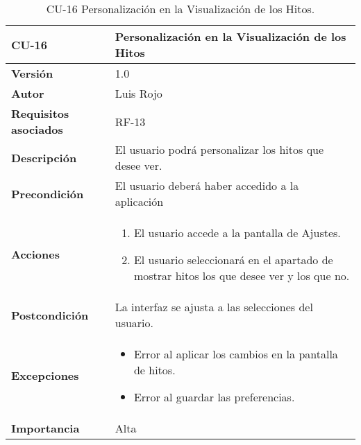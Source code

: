 \begin{table}[p]
	\centering
	\begin{tabularx}{\linewidth}{ p{} p{} }
		\toprule
		\textbf{CU-16}    & \textbf{Personalización en la Visualización de los Hitos}\\
		\toprule
		\textbf{Versión}              & 1.0    \\
		\textbf{Autor}                & Luis Rojo \\
		\textbf{Requisitos asociados} & RF-13 \\
		\textbf{Descripción}          & El usuario podrá personalizar los hitos que desee ver. \\
		\textbf{Precondición}         &  El usuario deberá haber accedido a la aplicación \\
		\textbf{Acciones}             &
		\begin{enumerate}
			\def\labelenumi{\arabic{enumi}.}
			\tightlist
			\item El usuario accede a la pantalla de Ajustes.
                \item El usuario seleccionará en el apartado de mostrar hitos los que desee ver y los que no.
		\end{enumerate}\\
		\textbf{Postcondición}        & La interfaz se ajusta a las selecciones del usuario.  \\
		\textbf{Excepciones}          &  
            \begin{itemize}
                \item Error al aplicar los cambios en la pantalla de hitos.
                \item Error al guardar las preferencias.
            \end{itemize}
           \\
		\textbf{Importancia}          & Alta  \\
		\bottomrule
	\end{tabularx}
	\caption{CU-16 Personalización en la Visualización de los Hitos.}
\end{table}

